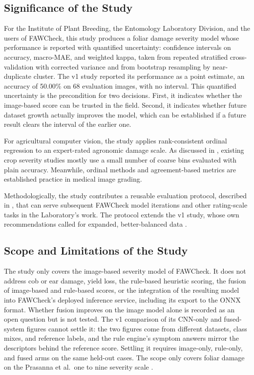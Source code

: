 \documentclass{icsthesis}
\newcommand{\secref}[1]{\textit{\nameref{#1}}}
\begin{document}
\begin{mainmatter}
			\subsection{Significance of the Study}\label{sec:significance}

				For the Institute of Plant Breeding, the Entomology Laboratory Division, and the
				users of FAWCheck, this study produces a foliar damage severity model whose
				performance is reported with quantified uncertainty: confidence intervals on
				accuracy, macro-MAE, and weighted kappa, taken from repeated stratified
				cross-validation with corrected variance and from bootstrap resampling by
				near-duplicate cluster. The v1 study reported its performance as a point estimate,
				an accuracy of 50.00\% on 68 evaluation images, with no interval. This quantified
				uncertainty is the precondition for two decisions. First, it indicates whether the
				image-based score can be trusted in the field. Second, it indicates whether future
				dataset growth actually improves the model, which can be established if a future
				result clears the interval of the earlier one.

				For agricultural computer vision, the study applies rank-consistent ordinal
				regression to an expert-rated agronomic damage scale. As discussed in
				\secref{sec:cnnsev}, existing crop severity studies mostly use a small number of
				coarse bins evaluated with plain accuracy. Meanwhile, ordinal methods and
				agreement-based metrics are established practice in medical image grading.

				Methodologically, the study contributes a reusable evaluation protocol, described in
				\secref{sec:protocol}, that can serve subsequent FAWCheck model iterations and other
				rating-scale tasks in the Laboratory's work. The protocol extends the v1 study,
				whose own recommendations called for expanded, better-balanced data
				\citep{casasola2026}.

			\subsection{Scope and Limitations of the Study}\label{sec:scope}

				The study only covers the image-based severity model of FAWCheck. It does not
				address cob or ear damage, yield loss, the rule-based heuristic scoring, the fusion
				of image-based and rule-based scores, or the integration of the resulting model into FAWCheck's deployed inference service, including its export to the ONNX format. Whether fusion improves on the image model
				alone is recorded as an open question but is not tested. The v1 comparison of its CNN-only and fused-system figures \citep{casasola2026} cannot settle it: the two figures come from different datasets, class mixes, and reference labels, and the rule engine's symptom answers mirror the descriptors behind the reference score. Settling it requires image-only, rule-only, and fused arms on the same held-out cases. The scope only covers
				foliar damage on the Prasanna et al.\ one to nine severity scale
				\citep{prasanna2018}.


\end{mainmatter}
\end{document}
